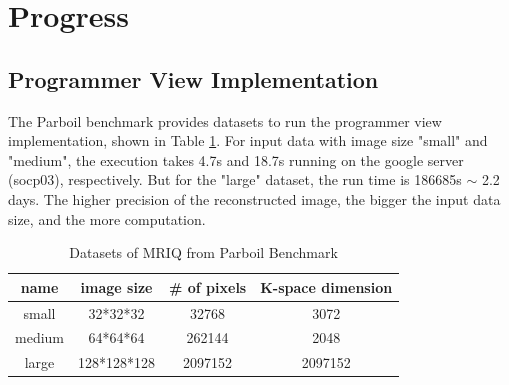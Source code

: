 \documentclass{sig-alternate}
\begin{document}
\vspace{-4mm}
\section{Progress}

\subsection{Programmer View Implementation}
The Parboil benchmark provides datasets to run the programmer view implementation, shown in Table \ref{tab-1}. For input data with image size "small" and "medium", the execution takes 4.7s and 18.7s running on the google server (socp03), respectively. But for the "large" dataset, the run time is 186685s $ \sim$ 2.2 days. The higher precision of the reconstructed image, the bigger the input data size, and the more computation.
\begin{table}[h!]
    \centering
    \begin{tabular}{c|c|c|c}
    \hline
       name  & image size & \# of pixels & K-space dimension  \\
    \hline
        small  & 32*32*32 & 32768 & 3072 \\
        medium & 64*64*64 & 262144 & 2048\\
        large & 128*128*128 & 2097152 & 2097152\\
        \hline
    \end{tabular}
    \caption{Datasets of MRIQ from Parboil Benchmark}
    \label{tab-1}
\end{table}
\end{document}
